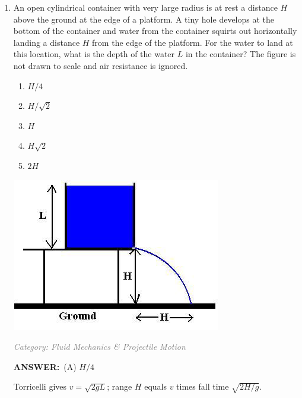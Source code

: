 \documentclass[12pt, a4paper]{article}
\makeatletter
\newcommand{\finalanswer}[1]{\textbf{ANSWER:}~#1}
\newif\if@categoryprinted
\newcommand{\category}[1]{\if@categoryprinted\relax\else\textit{\textcolor{gray}{Category: #1}}\global\@categoryprintedtrue\fi}
\newcommand{\tags}[1]{}
\makeatother
\begin{document}
\begin{CJK*}{UTF8}{gbsn}
\begin{enumerate}[itemsep=1.0em, topsep=0.6em]
\item \label{prob:18}
\noindent\begin{minipage}[t]{0.6\linewidth}
\vspace{0pt}
An open cylindrical container with very large radius is at rest a distance $H$ above the ground at the edge of a platform. A tiny hole develops at the bottom of the container and water from the container squirts out horizontally landing a distance $H$ from the edge of the platform. For the water to land at this location, what is the depth of the water $L$ in the container? The figure is not drawn to scale and air resistance is ignored.
\begin{enumerate}[label=(\Alph*)]
    \item $H/4$
    \item $H/\sqrt{2}$
    \item $H$
    \item $H\sqrt{2}$
    \item $2H$
\end{enumerate}
\end{minipage}%
\hfill
\begin{minipage}[t]{0.32\linewidth}
\vspace{0pt}
\centering
\includegraphics[width=\linewidth]{Problem_18_Figure.png}
\end{minipage}

\category{Fluid Mechanics \& Projectile Motion} \tags{}
\begin{answerbox}
\finalanswer{(A) $H/4$}
\end{answerbox}
\begin{insightbox}
Torricelli gives $v=\sqrt{2gL}$; range $H$ equals $v$ times fall time $\sqrt{2H/g}$.
\end{insightbox}
\begin{solutionbox}


\end{solutionbox}
\end{enumerate}
\end{CJK*}
\end{document}
